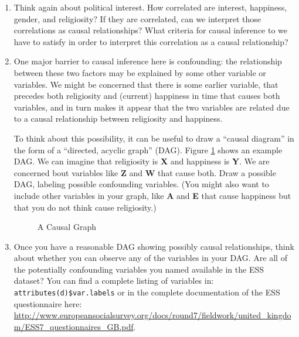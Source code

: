 \documentclass[a4paper,12pt]{article}
\begin{document}
\begin{enumerate}

\item Think again about political interest. How correlated are interest, happiness, gender, and religiosity? If they are correlated, can we interpret those correlations as causal relationships? What criteria for causal inference to we have to satisfy in order to interpret this correlation as a causal relationship?

\item One major barrier to causal inference here is confounding: the relationship between these two factors may be explained by some other variable or variables. We might be concerned that there is some earlier variable, that precedes both religiosity and (current) happiness in time that causes both variables, and in turn makes it appear that the two variables are related due to a causal relationship between religiosity and happiness.

To think about this possibility, it can be useful to draw a ``causal diagram'' in the form of a ``directed, acyclic graph'' (DAG). Figure \ref{fig:causalgraph} shows an example DAG. We can imagine that religiosity is \textbf{X} and happiness is \textbf{Y}. We are concerned bout variables like \textbf{Z} and \textbf{W} that cause both. Draw a possible DAG, labeling possible confounding variables. (You might also want to include other variables in your graph, like \textbf{A} and \textbf{E} that cause happiness but that you do not think cause religiosity.)

\begin{figure}
\centering
{}
\caption{A Causal Graph}\label{fig:causalgraph}
\end{figure}


\item Once you have a reasonable DAG showing possibly causal relationships, think about whether you can observe any of the variables in your DAG. Are all of the potentially confounding variables you named available in the ESS dataset? You can find a complete listing of variables in: \texttt{attributes(d)\$var.labels} or in the complete documentation of the ESS questionnaire here: \url{http://www.europeansocialsurvey.org/docs/round7/fieldwork/united_kingdom/ESS7_questionnaires_GB.pdf}.


\end{enumerate}
\end{document}
